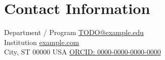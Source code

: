\section{Contact Information}
%
%
%
Department / Program        \hfill \href{mailto:TODO@example.edu}{TODO@example.edu}\\
Institution                 \hfill \href{https://example.com/}{example.com}\\
City, ST 00000 USA          \hfill \href{https://orcid.org/0000-0000-0000-0000}{ORCID: 0000-0000-0000-0000}
%


